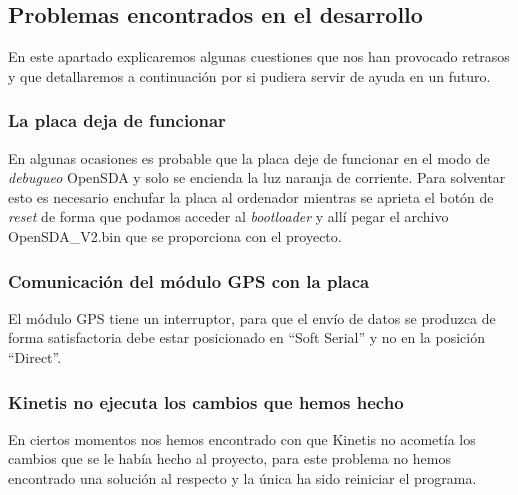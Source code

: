 \subsection{Problemas encontrados en el desarrollo}
En este apartado explicaremos algunas cuestiones que nos han provocado retrasos y que detallaremos a continuación por si pudiera servir de ayuda en un futuro.

\subsubsection{La placa deja de funcionar}
En algunas ocasiones es probable que la placa deje de funcionar en el modo de \textit{debugueo} OpenSDA y solo se encienda la luz naranja de corriente. Para solventar esto es necesario enchufar la placa al ordenador mientras se aprieta el botón de \textit{reset} de forma que podamos acceder al \textit{bootloader} y allí pegar el archivo OpenSDA\_V2.bin que se proporciona con el proyecto.

\subsubsection{Comunicación del módulo GPS con la placa}
El módulo GPS tiene un interruptor, para que el envío de datos se produzca de forma satisfactoria debe estar posicionado en ``Soft Serial'' y no en la posición ``Direct''.

\subsubsection{Kinetis no ejecuta los cambios que hemos hecho}
En ciertos momentos nos hemos encontrado con que Kinetis no acometía los cambios que se le había hecho al proyecto, para este problema no hemos encontrado una solución al respecto y la única ha sido reiniciar el programa.

